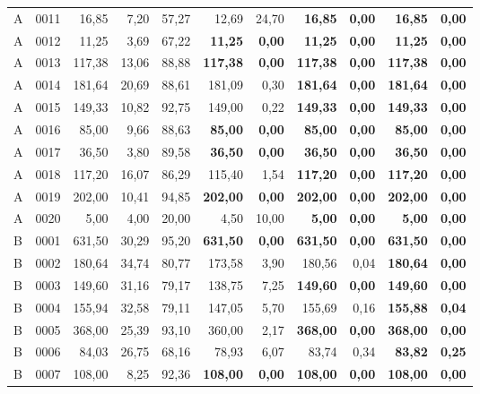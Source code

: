 \begin{longtable}{llrrrrrrrrr}
A & 0011 & 16,85 & 7,20 & 57,27 & 12,69 & 24,70 & \textbf{16,85} & \textbf{0,00} & \textbf{16,85} & \textbf{0,00} \\
A & 0012 & 11,25 & 3,69 & 67,22 & \textbf{11,25} & \textbf{0,00} & \textbf{11,25} & \textbf{0,00} & \textbf{11,25} & \textbf{0,00} \\
A & 0013 & 117,38 & 13,06 & 88,88 & \textbf{117,38} & \textbf{0,00} & \textbf{117,38} & \textbf{0,00} & \textbf{117,38} & \textbf{0,00} \\
A & 0014 & 181,64 & 20,69 & 88,61 & 181,09 & 0,30 & \textbf{181,64} & \textbf{0,00} & \textbf{181,64} & \textbf{0,00} \\
A & 0015 & 149,33 & 10,82 & 92,75 & 149,00 & 0,22 & \textbf{149,33} & \textbf{0,00} & \textbf{149,33} & \textbf{0,00} \\
A & 0016 & 85,00 & 9,66 & 88,63 & \textbf{85,00} & \textbf{0,00} & \textbf{85,00} & \textbf{0,00} & \textbf{85,00} & \textbf{0,00} \\
A & 0017 & 36,50 & 3,80 & 89,58 & \textbf{36,50} & \textbf{0,00} & \textbf{36,50} & \textbf{0,00} & \textbf{36,50} & \textbf{0,00} \\
A & 0018 & 117,20 & 16,07 & 86,29 & 115,40 & 1,54 & \textbf{117,20} & \textbf{0,00} & \textbf{117,20} & \textbf{0,00} \\
A & 0019 & 202,00 & 10,41 & 94,85 & \textbf{202,00} & \textbf{0,00} & \textbf{202,00} & \textbf{0,00} & \textbf{202,00} & \textbf{0,00} \\
A & 0020 & 5,00 & 4,00 & 20,00 & 4,50 & 10,00 & \textbf{5,00} & \textbf{0,00} & \textbf{5,00} & \textbf{0,00} \\
B & 0001 & 631,50 & 30,29 & 95,20 & \textbf{631,50} & \textbf{0,00} & \textbf{631,50} & \textbf{0,00} & \textbf{631,50} & \textbf{0,00} \\
B & 0002 & 180,64 & 34,74 & 80,77 & 173,58 & 3,90 & 180,56 & 0,04 & \textbf{180,64} & \textbf{0,00} \\
B & 0003 & 149,60 & 31,16 & 79,17 & 138,75 & 7,25 & \textbf{149,60} & \textbf{0,00} & \textbf{149,60} & \textbf{0,00} \\
B & 0004 & 155,94 & 32,58 & 79,11 & 147,05 & 5,70 & 155,69 & 0,16 & \textbf{155,88} & \textbf{0,04} \\
B & 0005 & 368,00 & 25,39 & 93,10 & 360,00 & 2,17 & \textbf{368,00} & \textbf{0,00} & \textbf{368,00} & \textbf{0,00} \\
B & 0006 & 84,03 & 26,75 & 68,16 & 78,93 & 6,07 & 83,74 & 0,34 & \textbf{83,82} & \textbf{0,25} \\
B & 0007 & 108,00 & 8,25 & 92,36 & \textbf{108,00} & \textbf{0,00} & \textbf{108,00} & \textbf{0,00} & \textbf{108,00} & \textbf{0,00} \\

\end{longtable}
